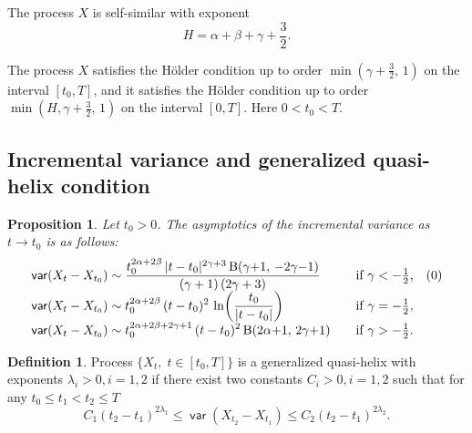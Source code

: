 \documentclass{article}
\DeclareMathOperator{\var}{\mathsf{var}}
\theoremstyle{plain}
\newtheorem{proposition}{Proposition}
\theoremstyle{definition}
\newtheorem{defn}{Definition}
\begin{document}
The process $X$ is self-similar with exponent
\[
H = \alpha+\beta+\gamma+\frac32 .
\]

The process $X$ satisfies the H\"older condition
up to order $\min(\gamma+\frac32, \, 1)$
on the interval $[t_0, T]$,
and it satisfies 
the H\"older condition
up to order $\min(H, \gamma+\frac32, \, 1)$
on the interval $[0, T]$.
Here $0<t_0<T$.

\subsection{Incremental variance and generalized quasi-helix condition}
\begin{proposition}\label{prop:localvar}
Let $t_0 > 0$.
The asymptotics of the incremental variance as $t\to t_0$
is as follows:
\begin{equation*}
\begin{array}{l@{\qquad}l}
\displaystyle \var(X_{t}-X_{t_0}) \sim \frac
{t_0^{2\alpha+2\beta} \, |t - t_0|^{2\gamma+3} \,
\mathrm{B}(\gamma{+}1,\, {-}2\gamma{-}1)} {(\gamma + 1)\,(2\gamma
+ 3)}
& \mbox{if $\gamma<-\frac12$,}
\quad (\theequation) \\
\displaystyle \var(X_{t}-X_{t_0}) \sim t_0^{2\alpha+2\beta} \,
(t - t_0)^2 \, \ln\!\left( \frac{t_0}{|t - t_0|} \right)
& \mbox{if $\gamma=-\frac12$,} \\
\displaystyle \var(X_{t}-X_{t_0}) \sim
t_0^{2\alpha+2\beta+2\gamma+1} \, (t - t_0)^2 \,
\mathrm{B}(2\alpha{+}1,\, 2\gamma{+}1) & \mbox{if
$\gamma>-\frac12$.}
\end{array}
\end{equation*}
\end{proposition}


\begin{defn}
Process $\{X_t, \; t\mathbin{\in}[t_0,T]\}$
is a generalized  quasi-helix  with
exponents $\lambda_i>0, i=1,2$   if there exist two constants $C_i>0, i=1,2$ such that for any
$t_0  \le  t_1 < t_2  \le  T$
\[
C_1 (t_2-t_1)^{2\lambda_1} \le \var(X_{t_2} - X_{t_1}) \le
C_2 (t_2-t_1)^{2\lambda_2}.
\]
\end{defn}
\end{document}
